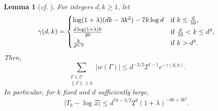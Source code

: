 \documentclass[10pt,a4paper]{amsart}
\newtheorem{lem}[thm]{Lemma}
\theoremstyle{definition}
\newcommand{\cC}{\mathcal{C} }
\newcommand{\beq}[1]{\begin{equation}\label{#1}}
\newcommand{\enq}[0]{\end{equation}}
\newcommand{\0}[0]{\emptyset}
\newcommand{\lam}{\lambda}
\begin{document}
\begin{lem}[\textit{cf.} {\cite[Lemma 15]{hypercube}}]\label{lem15}
    For integers $d, k\geq 1$, let
    \[\gamma(d, k) = \begin{cases*}
        \log (1+\lam)(dk-3k^2) - 7k\log d& if $k\leq \frac{d}{10}$, \\
        \frac{d\log(1+\lam)k}{20}& if $\frac{d}{10}<k\leq d^4$,\\
        \frac{k}{d^{3/2}}& if $k>d^4$.
    \end{cases*} \]
    Then,
    \beq{kpbdcube} \sum_{\substack{\Gamma\in\cC \\ \|\Gamma\|\geq k}} |w(\Gamma)| \leq d^{-3/2}2^{d-1}e^{-\gamma(d, k)}. \enq
    In particular, for $k$ fixed and $d$ sufficiently large,
    \beq{kptailscube} |T_k - \log \Xi| \leq d^{7k-3/2}2^d(1+\lam)^{-dk+3k^2}. \enq
\end{lem}
\end{document}
